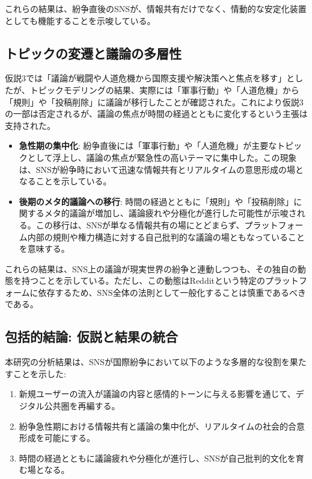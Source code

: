 \documentclass[11pt, a4j]{jreport}
\begin{document}
    これらの結果は、紛争直後のSNSが、情報共有だけでなく、情動的な安定化装置としても機能することを示唆している。

    \subsection{トピックの変遷と議論の多層性}
    仮説3では「議論が戦闘や人道危機から国際支援や解決策へと焦点を移す」としたが、トピックモデリングの結果、実際には「軍事行動」や「人道危機」から「規則」や「投稿削除」に議論が移行したことが確認された。これにより仮説3の一部は否定されるが、議論の焦点が時間の経過とともに変化するという主張は支持された。

    \begin{itemize}
        \item \textbf{急性期の集中化}: 紛争直後には「軍事行動」や「人道危機」が主要なトピックとして浮上し、議論の焦点が緊急性の高いテーマに集中した。この現象は、SNSが紛争時において迅速な情報共有とリアルタイムの意思形成の場となることを示している。
        \item \textbf{後期のメタ的議論への移行}: 時間の経過とともに「規則」や「投稿削除」に関するメタ的議論が増加し、議論疲れ\cite{sunstein2001republic}や分極化が進行した可能性が示唆される。この移行は、SNSが単なる情報共有の場にとどまらず、プラットフォーム内部の規則や権力構造に対する自己批判的な議論の場ともなっていることを意味する。
    \end{itemize}

    これらの結果は、SNS上の議論が現実世界の紛争と連動しつつも、その独自の動態を持つことを示している。ただし、この動態はRedditという特定のプラットフォームに依存するため、SNS全体の法則として一般化することは慎重であるべきである。

    \subsection{包括的結論: 仮説と結果の統合}
    本研究の分析結果は、SNSが国際紛争において以下のような多層的な役割を果たすことを示した:
    \begin{enumerate}
        \item 新規ユーザーの流入が議論の内容と感情的トーンに与える影響を通じて、デジタル公共圏を再編する。
        \item 紛争急性期における情報共有と議論の集中化が、リアルタイムの社会的合意形成を可能にする。
        \item 時間の経過とともに議論疲れや分極化が進行し、SNSが自己批判的文化を育む場となる。
    \end{enumerate}
\end{document}
